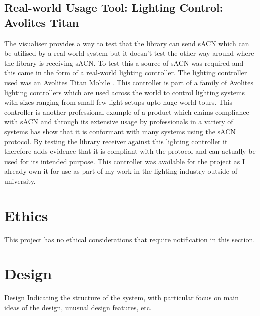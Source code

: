 \documentclass[11pt,a4paper]{report}
\begin{document}
\subsection{Real-world Usage Tool: Lighting Control: Avolites Titan}
The visualiser provides a way to test that the library can send sACN which can be utilised by a real-world system but it doesn't test the other-way around where the library is receiving sACN. To test this a source of sACN was required and this came in the form of a real-world lighting controller. The lighting controller used was an Avolites Titan Mobile \cite{AVO_TITAN_MOBILE}. This controller is part of a family of Avolites lighting controllers which are used across the world to control lighting systems with sizes ranging from small few light setups upto huge world-tours. This controller is another professional example of a product which claims compliance with sACN and through its extensive usage by professionals in a variety of systems has show that it is conformant with many systems using the sACN protocol. By testing the library receiver against this lighting controller it therefore adds evidence that it is compliant with the protocol and can actually be used for its intended purpose. This controller was available for the project as I already own it for use as part of my work in the lighting industry outside of university. 

\section{Ethics}
This project has no ethical considerations that require notification in this section.
	
\section{Design}
Design
	Indicating the structure of the system, with particular
	focus on main ideas of the design, unusual design
	features, etc.
\end{document}
